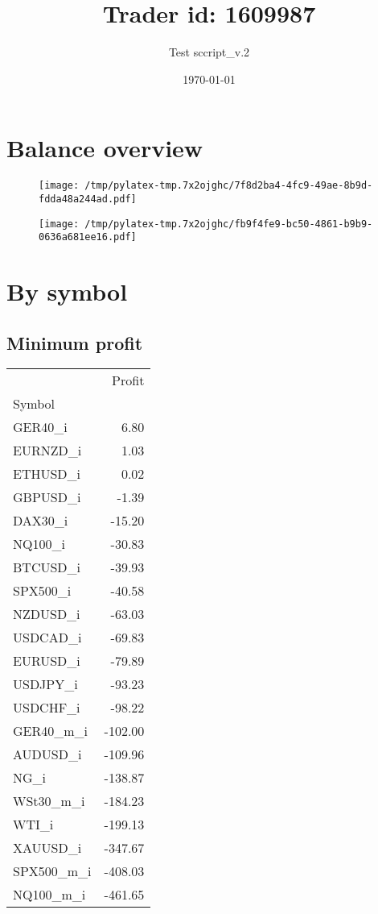 \documentclass{article}%
\title{Trader id: 1609987}%
\author{Test sccript\_v.2}%
\date{\today}%
\begin{document}
%
\normalsize%
\maketitle%
\section{Balance overview}%
\label{sec:Balanceoverview}%


\begin{figure}[htbp]%
\centering%
\texttt{[image: /tmp/pylatex-tmp.7x2ojghc/7f8d2ba4-4fc9-49ae-8b9d-fdda48a244ad.pdf]}%
\end{figure}

%


\begin{figure}[htbp]%
\centering%
\texttt{[image: /tmp/pylatex-tmp.7x2ojghc/fb9f4fe9-bc50-4861-b9b9-0636a681ee16.pdf]}%
\end{figure}

%
\section{By symbol}%
\label{sec:Bysymbol}%
\subsection{Minimum profit }%
\label{subsec:Minimumprofit}%
\begin{tabular}{lr}
\toprule
{} &  Profit \\
Symbol     &         \\
\midrule
GER40\_i    &    6.80 \\
EURNZD\_i   &    1.03 \\
ETHUSD\_i   &    0.02 \\
GBPUSD\_i   &   -1.39 \\
DAX30\_i    &  -15.20 \\
NQ100\_i    &  -30.83 \\
BTCUSD\_i   &  -39.93 \\
SPX500\_i   &  -40.58 \\
NZDUSD\_i   &  -63.03 \\
USDCAD\_i   &  -69.83 \\
EURUSD\_i   &  -79.89 \\
USDJPY\_i   &  -93.23 \\
USDCHF\_i   &  -98.22 \\
GER40\_m\_i  & -102.00 \\
AUDUSD\_i   & -109.96 \\
NG\_i       & -138.87 \\
WSt30\_m\_i  & -184.23 \\
WTI\_i      & -199.13 \\
XAUUSD\_i   & -347.67 \\
SPX500\_m\_i & -408.03 \\
NQ100\_m\_i  & -461.65 \\
\bottomrule
\end{tabular}
%
\end{document}
